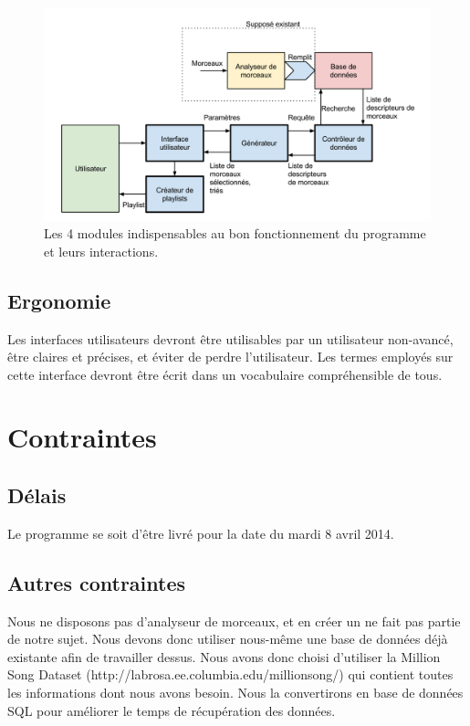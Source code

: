 \documentclass[11pt,a4paper]{article}
\begin{document}
\begin{figure}[!h]
\includegraphics[width=14cm]{modules.png}
\caption{Les 4 modules indispensables au bon fonctionnement du programme et leurs
interactions.}
\end{figure}

\subsection{Ergonomie}
Les interfaces utilisateurs devront être utilisables par un utilisateur
non-avancé, être claires et précises, et éviter de perdre l’utilisateur. Les
termes employés sur cette interface devront être écrit dans un vocabulaire
compréhensible de tous.

\newpage

\section{Contraintes}
\label{sec:contraintes}

\subsection{Délais}
Le programme se soit d’être livré pour la date du mardi 8 avril 2014.

\subsection{Autres contraintes}
Nous ne disposons pas d’analyseur de morceaux, et en créer un ne fait pas partie
de notre sujet. Nous devons donc utiliser nous-même une base de données déjà
existante afin de travailler dessus. Nous avons donc choisi d’utiliser la Million
Song Dataset (http://labrosa.ee.columbia.edu/millionsong/) qui contient toutes
les informations dont nous avons besoin. Nous la convertirons en base de données
SQL pour améliorer le temps de récupération des données.
    
\end{document}
